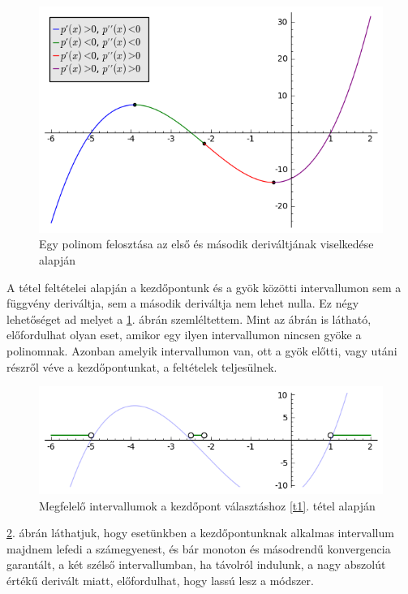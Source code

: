 \documentclass[a4paper,12pt]{report}
\begin{document}
			\begin{figure}[ht]
				\centering
				\includegraphics[scale=0.6]{kepek/kep2.png}
				\caption{Egy polinom felosztása az első és második deriváltjának viselkedése alapján}\label{k2}
			\end{figure}

			A tétel feltételei alapján a kezdőpontunk és a gyök közötti intervallumon sem a függvény deriváltja, sem a második deriváltja nem lehet nulla. Ez négy lehetőséget ad melyet a \ref{k2}. ábrán szemléltettem. Mint az ábrán is látható, előfordulhat olyan eset, amikor egy ilyen intervallumon nincsen gyöke a polinomnak. Azonban amelyik intervallumon van, ott a gyök előtti, vagy utáni részről véve a kezdőpontunkat, a feltételek teljesülnek.

			\begin{figure}[ht]
				\centering
				\includegraphics[scale=0.6]{kepek/kep3.png}
				\caption{Megfelelő intervallumok a kezdőpont választáshoz \ref{t1}. tétel alapján}\label{k3}
			\end{figure}

			\ref{k3}. ábrán láthatjuk, hogy esetünkben a kezdőpontunknak alkalmas intervallum majdnem lefedi a számegyenest, és bár monoton és másodrendű konvergencia garantált, a két szélső intervallumban, ha távolról indulunk, a nagy abszolút értékű derivált miatt, előfordulhat, hogy lassú lesz a módszer.
\end{document}
